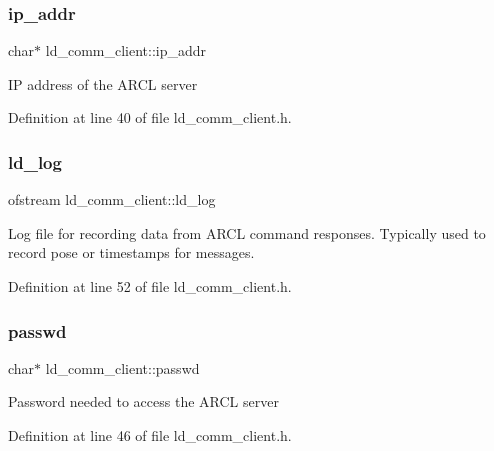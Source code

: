 \subsubsection{\texorpdfstring{ip\+\_\+addr}{ip\_addr}}
{\footnotesize\ttfamily char$\ast$ ld\+\_\+comm\+\_\+client\+::ip\+\_\+addr\hspace{0.3cm}{\ttfamily [private]}}

IP address of the A\+R\+CL server 

Definition at line 40 of file ld\+\_\+comm\+\_\+client.\+h.

\mbox{\label{classld__comm__client_ae7c62ed3fe8a6dbdf0880787aa66ef22}} 
\subsubsection{\texorpdfstring{ld\+\_\+log}{ld\_log}}
{\footnotesize\ttfamily ofstream ld\+\_\+comm\+\_\+client\+::ld\+\_\+log\hspace{0.3cm}{\ttfamily [private]}}

Log file for recording data from A\+R\+CL command responses. Typically used to record pose or timestamps for messages. 

Definition at line 52 of file ld\+\_\+comm\+\_\+client.\+h.

\mbox{\label{classld__comm__client_ab914c19b95803935ccef004d740b6a99}} 
\subsubsection{\texorpdfstring{passwd}{passwd}}
{\footnotesize\ttfamily char$\ast$ ld\+\_\+comm\+\_\+client\+::passwd\hspace{0.3cm}{\ttfamily [private]}}

Password needed to access the A\+R\+CL server 

Definition at line 46 of file ld\+\_\+comm\+\_\+client.\+h.

\mbox{\label{classld__comm__client_a78947765ccf3fcb1f85558427db9e4de}} 
